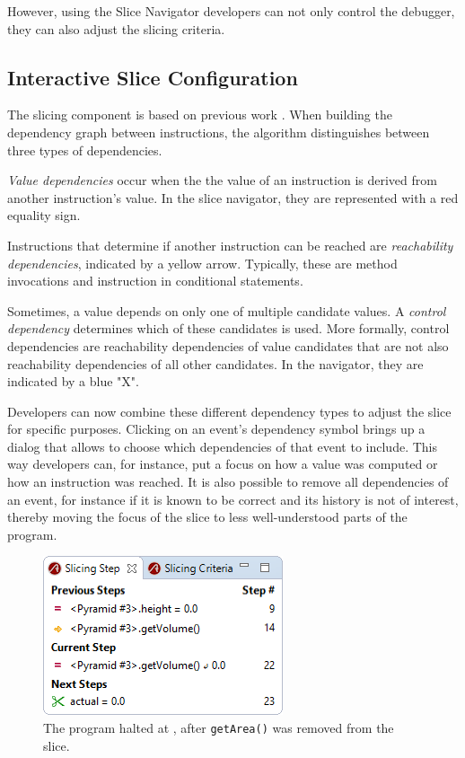 ﻿\documentclass[
      english,
			conference,
      ]{IEEEtran}
\begin{document}
However, using the Slice Navigator developers can not only control the debugger, they can also adjust the slicing criteria.

\subsection{Interactive Slice Configuration}

The slicing component is based on previous work \cite{treffer_dynamic_2014}.
When building the dependency graph between instructions, the algorithm distinguishes between three types of dependencies.

\emph{Value dependencies} occur when the the value of an instruction is derived from another instruction's value.
In the slice navigator, they are represented with a red equality sign.

Instructions that determine if another instruction can be reached are \emph{reachability dependencies}, indicated by a yellow arrow.
Typically, these are method invocations and instruction in conditional statements.

Sometimes, a value depends on only one of multiple candidate values. 
A \emph{control dependency} determines which of these candidates is used.
More formally, control dependencies are reachability dependencies of value candidates that are not also reachability dependencies of all other candidates.
In the navigator, they are indicated by a blue "X".

Developers can now combine these different dependency types to adjust the slice for specific purposes.
Clicking on an event's dependency symbol brings up a dialog that allows to choose which dependencies of that event to include.
This way developers can, for instance, put a focus on how a value was computed or how an instruction was reached.
It is also possible to remove all dependencies of an event, for instance if it is known to be correct and its history is not of interest, thereby moving the focus of the slice to less well-understood parts of the program.

\begin{figure}
	\centering
		\includegraphics[width=0.80\linewidth]{slice2.png}
	\caption{The program halted at , after \lstinline{getArea()} was removed from the slice.}
	\label{fig:slice2}
\end{figure}
\end{document}
